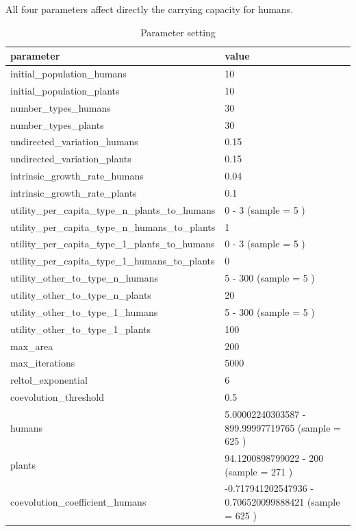 \documentclass[
]{book}
\begin{document}

All four parameters affect directly the carrying capacity for humans.

\begin{table}[!h]

\caption{\label{tab:4UbHUPHtablepdf}Parameter setting}
\centering
\begin{tabular}[t]{l|l}
\hline
parameter & value\\
\hline
initial\_population\_humans & 10\\
\hline
initial\_population\_plants & 10\\
\hline
number\_types\_humans & 30\\
\hline
number\_types\_plants & 30\\
\hline
undirected\_variation\_humans & 0.15\\
\hline
undirected\_variation\_plants & 0.15\\
\hline
intrinsic\_growth\_rate\_humans & 0.04\\
\hline
intrinsic\_growth\_rate\_plants & 0.1\\
\hline
utility\_per\_capita\_type\_n\_plants\_to\_humans & 0 - 3 (sample = 5 )\\
\hline
utility\_per\_capita\_type\_n\_humans\_to\_plants & 1\\
\hline
utility\_per\_capita\_type\_1\_plants\_to\_humans & 0 - 3 (sample = 5 )\\
\hline
utility\_per\_capita\_type\_1\_humans\_to\_plants & 0\\
\hline
utility\_other\_to\_type\_n\_humans & 5 - 300 (sample = 5 )\\
\hline
utility\_other\_to\_type\_n\_plants & 20\\
\hline
utility\_other\_to\_type\_1\_humans & 5 - 300 (sample = 5 )\\
\hline
utility\_other\_to\_type\_1\_plants & 100\\
\hline
max\_area & 200\\
\hline
max\_iterations & 5000\\
\hline
reltol\_exponential & 6\\
\hline
coevolution\_threshold & 0.5\\
\hline
humans & 5.00002240303587 - 899.99997719765 (sample = 625 )\\
\hline
plants & 94.1200898799022 - 200 (sample = 271 )\\
\hline
coevolution\_coefficient\_humans & -0.717941202547936 - 0.706520099888421 (sample = 625 )\\

\end{tabular}
\end{table}
\end{document}
